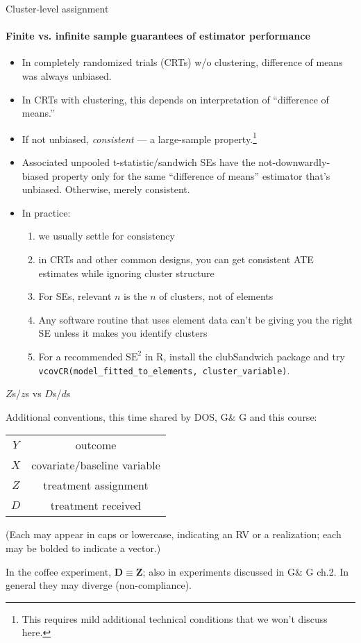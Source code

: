 \begin{frame}[shrink]{Cluster-level assignment}
\framesubtitle{Finite vs. infinite sample guarantees of estimator performance}

\begin{itemize}
\item In completely randomized trials (CRTs) w/o clustering, difference of means was always unbiased.
\item In CRTs with clustering, this depends on interpretation of ``difference of means.''
\item If not unbiased, \textit{consistent} --- a large-sample property.\footnote{This requires mild additional technical conditions that we won't discuss here.}
\item Associated unpooled t-statistic/sandwich SEs have the not-downwardly-biased property only for the same ``difference of means'' estimator that's unbiased.  Otherwise, merely consistent.

\item In practice:
  \begin{enumerate}
  \item we usually settle for consistency
  \item in CRTs and other common designs, you can get consistent ATE estimates while ignoring cluster structure
  \item For SEs, relevant $n$ is the $n$ of clusters, not of elements
  \item Any software routine that uses element data can't be giving
    you the right SE unless it makes you identify clusters
  \item For a recommended $\mathrm{SE}^2$ in R, install the clubSandwich package and try \texttt{vcovCR(model\_fitted\_to\_elements, cluster\_variable)}.
  \end{enumerate}
\end{itemize}
\end{frame}

\begin{frame}{$Z$s/$z$s vs $D$s/$d$s}
  
Additional conventions, this time shared by DOS, G\& G and this course:

\begin{tabular}{cc}
  $Y$ & outcome \\
  $X$ & covariate/baseline variable\\
  $Z$ & treatment assignment\\
  $D$ & treatment received \\
\end{tabular}
\pause

(Each may appear in caps or lowercase, indicating an RV or a realization; each may be bolded to indicate a vector.) \pause

In the coffee experiment, $\mathbf{D} \equiv \mathbf{Z}$; also in experiments discussed in G\& G ch.2.  In general they may diverge (non-compliance). 

\end{frame}



